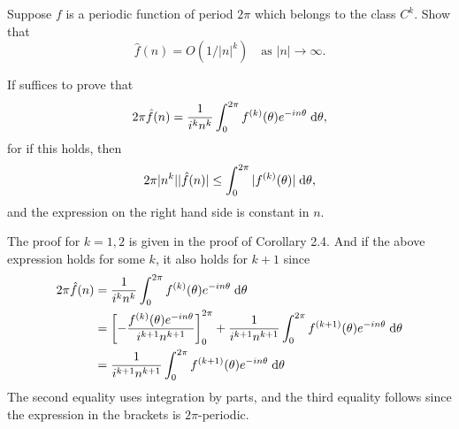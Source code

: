 \begin{exrc}[10]
    Suppose \(f\) is a periodic function of period \(2\pi\) which belongs to the class \(C^k\).
    Show that
    \begin{equation*}
        \hat{f}(n) = O(1 / |n|^k) \quad \text{as \(|n| \to \infty\)}.
    \end{equation*}

\begin{soln}
    If suffices to prove that
    \begin{equation*}
        2\pi\hat{f}(n) = \frac{1}{i^k n^k} \int_{0}^{2\pi} f^{(k)}(\theta)e^{-in\theta} \;\mathrm d \theta,
    \end{equation*}
    for if this holds, then
    \begin{equation*}
        2\pi |n^k| |\hat{f}(n)| \leq \int_{0}^{2\pi} |f^{(k)}(\theta)| \;\mathrm d \theta,
    \end{equation*}
    and the expression on the right hand side is constant in \(n\).

    The proof for \(k = 1, 2\) is given in the proof of Corollary 2.4.
    And if the above expression holds for some \(k\), it also holds for \(k + 1\) since
    \begin{align*}
        2\pi \hat{f}(n)
        &= \frac{1}{i^k n^k} \int_{0}^{2\pi} f^{(k)}(\theta) e^{-in\theta} \ud \theta \\
        &= \sqbr{- \frac{f^{(k)}(\theta) e^{-in\theta}}{i^{k + 1} n^{k + 1}}}_{0}^{2\pi}
        + \frac{1}{i^{k + 1} n^{k + 1}} \int_{0}^{2\pi} f^{(k + 1)}(\theta) e^{-in\theta} \ud \theta \\
        &= \frac{1}{i^{k + 1} n^{k + 1}} \int_{0}^{2\pi} f^{(k + 1)}(\theta) e^{-in\theta} \ud \theta
    \end{align*}
    The second equality uses integration by parts,
    and the third equality follows since the expression in the brackets is \(2\pi\)-periodic.


\end{soln}
\end{exrc}
